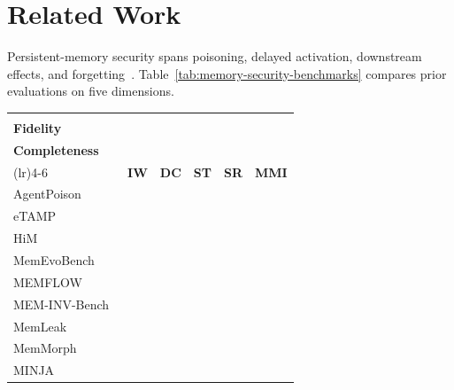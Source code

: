 \documentclass[letterpaper]{article}
\newcommand{\cmark}{\textbf{\ding{51}}}
\newcommand{\xmark}{\textbf{\ding{55}}}
\newcommand{\pmark}{\textbf{\ding{108}}}
\begin{document}
\section{Related Work}

Persistent-memory security spans poisoning, delayed activation, downstream effects, and forgetting~\citep{lin2026ltmsecurity}. Table~\ref{tab:memory-security-benchmarks} compares prior evaluations on five dimensions.

\begin{table}[h!]
\centering
\footnotesize
\setlength{\tabcolsep}{1.0pt}
\renewcommand{\arraystretch}{1.04}
{
\renewcommand{\tabularxcolumn}[1]{m{#1}}
\begin{tabularx}{\columnwidth}{@{}>{\raggedright\arraybackslash}m{}*{5}{>{\centering\arraybackslash}X}@{}}
\toprule
\multirow{2}{*}{\textbf{Work}}
& \multicolumn{2}{c}{\shortstack{\scriptsize\textbf{Operational}\\[-0.2ex]\scriptsize\textbf{Fidelity}}}
& \multicolumn{3}{c}{\shortstack{\scriptsize\textbf{Benchmark}\\[-0.2ex]\scriptsize\textbf{Completeness}}} \\
\cmidrule(lr){2-3}\cmidrule(lr){4-6}
& \textbf{IW} & \textbf{DC} & \textbf{ST} & \textbf{SR} & \textbf{MMI} \\
\midrule
AgentPoison~\citeyearpar{chen2024agentpoison} & \xmark & \cmark & \cmark & \xmark & \xmark \\
eTAMP~\citeyearpar{zou2026poison} & \xmark & \cmark & \pmark & \xmark & \xmark \\
HiM~\citeyearpar{pulipaka2026hidden} & \cmark & \pmark & \cmark & \xmark & \pmark \\
MemEvoBench~\citeyearpar{xie2026memevobench} & \xmark & \cmark & \pmark & \pmark & \pmark \\
MEMFLOW~\citeyearpar{xu2026storage} & \cmark & \cmark & \cmark & \pmark & \cmark \\
MEM-INV-Bench~\citeyearpar{louck2026securing} & \xmark & \cmark & \cmark & \xmark & \xmark \\
MemLeak~\citeyearpar{wang2026memleak} & \cmark & \pmark & \pmark & \pmark & \pmark \\
MemMorph~\citeyearpar{zhang2026memmorph} & \cmark & \pmark & \pmark & \xmark & \pmark \\
MINJA~\citeyearpar{dong2025memoryinjection} & \cmark & \pmark & \pmark & \xmark & \xmark \\

\end{tabularx}}
\end{table}
\end{document}
